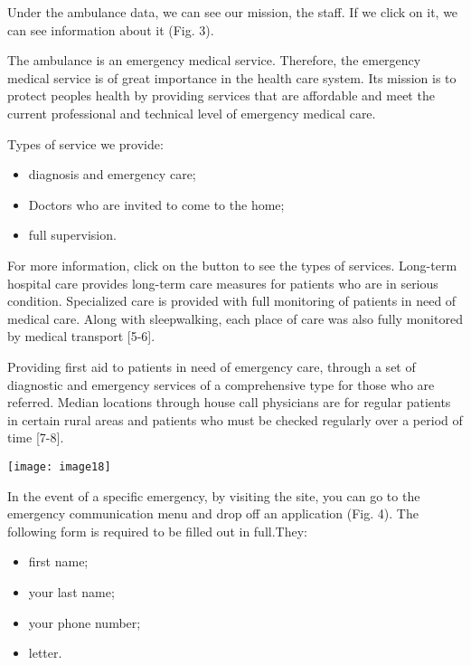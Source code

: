 \begin{multicols}{2}

Under the ambulance data, we can see our mission, the staff. If we click
on it, we can see information about it (Fig. 3).

The ambulance is an emergency medical service. Therefore, the emergency
medical service is of great importance in the health care system. Its
mission is to protect people\textquotesingle s health by providing
services that are affordable and meet the current professional and
technical level of emergency medical care.

Types of service we provide:

\begin{itemize}
\item
  diagnosis and emergency care;
\item
  Doctors who are invited to come to the home;
\item
  full supervision.
\end{itemize}

For more information, click on the button to see the types of services.
Long-term hospital care provides long-term care measures for patients
who are in serious condition. Specialized care is provided with full
monitoring of patients in need of medical care. Along with sleepwalking,
each place of care was also fully monitored by medical transport
{[}5-6{]}.

Providing first aid to patients in need of emergency care, through a set
of diagnostic and emergency services of a comprehensive type for those
who are referred. Median locations through house call physicians are for
regular patients in certain rural areas and patients who must be checked
regularly over a period of time {[}7-8{]}.

\centering
\texttt{[image: image18]}

In the event of a specific emergency, by visiting the site, you can go
to the emergency communication menu and drop off an application (Fig.
4). The following form is required to be filled out in full.They:

\begin{itemize}
\item
  first name;
\item
  your last name;
\item
  your phone number;
\item
  letter.
\end{itemize}

\end{multicols}

